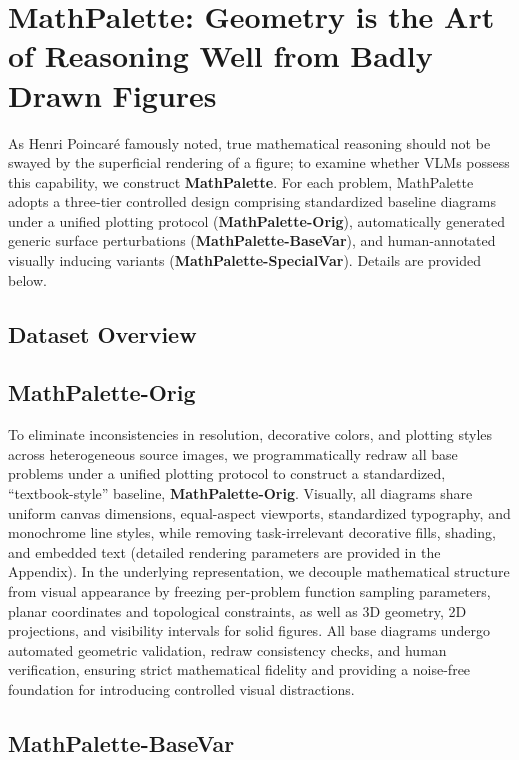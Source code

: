 \documentclass{article}
\theoremstyle{plain}
\theoremstyle{definition}
\theoremstyle{remark}
\begin{document}
\section{MathPalette: Geometry is the Art of Reasoning Well from Badly Drawn Figures}

As Henri Poincar\'e famously noted, true mathematical reasoning should not be swayed by the superficial rendering of a figure; to examine whether VLMs possess this capability, we construct \textbf{MathPalette}. For each problem, MathPalette adopts a three-tier controlled design comprising standardized baseline diagrams under a unified plotting protocol (\textbf{MathPalette-Orig}), automatically generated generic surface perturbations (\textbf{MathPalette-BaseVar}), and human-annotated visually inducing variants (\textbf{MathPalette-SpecialVar}). Details are provided below.

\subsection{Dataset Overview}

\subsection{MathPalette-Orig}

To eliminate inconsistencies in resolution, decorative colors, and plotting styles across heterogeneous source images, we programmatically redraw all base problems under a unified plotting protocol to construct a standardized, ``textbook-style'' baseline, \textbf{MathPalette-Orig}. Visually, all diagrams share uniform canvas dimensions, equal-aspect viewports, standardized typography, and monochrome line styles, while removing task-irrelevant decorative fills, shading, and embedded text (detailed rendering parameters are provided in the Appendix). In the underlying representation, we decouple mathematical structure from visual appearance by freezing per-problem function sampling parameters, planar coordinates and topological constraints, as well as 3D geometry, 2D projections, and visibility intervals for solid figures. All base diagrams undergo automated geometric validation, redraw consistency checks, and human verification, ensuring strict mathematical fidelity and providing a noise-free foundation for introducing controlled visual distractions.

\subsection{MathPalette-BaseVar}
\end{document}
